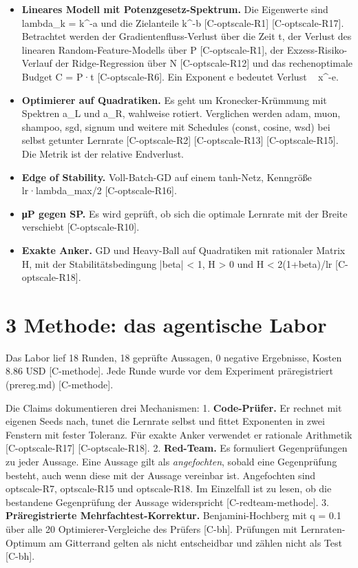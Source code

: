 \documentclass[10pt,twocolumn]{article}
\begin{document}
\begin{itemize}
\item \textbf{Lineares Modell mit Potenzgesetz-Spektrum.} Die Eigenwerte sind lambda_k = k^-a und die Zielanteile k^-b {\scriptsize[C-optscale-R1]} {\scriptsize[C-optscale-R17]}. Betrachtet werden der Gradientenfluss-Verlust über die Zeit t, der Verlust des linearen Random-Feature-Modells über P {\scriptsize[C-optscale-R1]}, der Exzess-Risiko-Verlauf der Ridge-Regression über N {\scriptsize[C-optscale-R12]} und das rechenoptimale Budget C = P·t {\scriptsize[C-optscale-R6]}. Ein Exponent e bedeutet Verlust ~ x^-e.
\item \textbf{Optimierer auf Quadratiken.} Es geht um Kronecker-Krümmung mit Spektren a_L und a_R, wahlweise rotiert. Verglichen werden adam, muon, shampoo, sgd, signum und weitere mit Schedules (const, cosine, wsd) bei selbst getunter Lernrate {\scriptsize[C-optscale-R2]} {\scriptsize[C-optscale-R13]} {\scriptsize[C-optscale-R15]}. Die Metrik ist der relative Endverlust.
\item \textbf{Edge of Stability.} Voll-Batch-GD auf einem tanh-Netz, Kenngröße lr·lambda_max/2 {\scriptsize[C-optscale-R16]}.
\item \textbf{μP gegen SP.} Es wird geprüft, ob sich die optimale Lernrate mit der Breite verschiebt {\scriptsize[C-optscale-R10]}.
\item \textbf{Exakte Anker.} GD und Heavy-Ball auf Quadratiken mit rationaler Matrix H, mit der Stabilitätsbedingung |beta| < 1, H > 0 und H < 2(1+beta)/lr {\scriptsize[C-optscale-R18]}.
\end{itemize}

\section{3 Methode: das agentische Labor}

Das Labor lief 18 Runden, 18 geprüfte Aussagen, 0 negative Ergebnisse, Kosten 8.86 USD {\scriptsize[C-methode]}. Jede Runde wurde vor dem Experiment präregistriert (prereg.md) {\scriptsize[C-methode]}.

Die Claims dokumentieren drei Mechanismen:
1. \textbf{Code-Prüfer.} Er rechnet mit eigenen Seeds nach, tunet die Lernrate selbst und fittet Exponenten in zwei Fenstern mit fester Toleranz. Für exakte Anker verwendet er rationale Arithmetik {\scriptsize[C-optscale-R17]} {\scriptsize[C-optscale-R18]}.
2. \textbf{Red-Team.} Es formuliert Gegenprüfungen zu jeder Aussage. Eine Aussage gilt als \emph{angefochten}, sobald eine Gegenprüfung besteht, auch wenn diese mit der Aussage vereinbar ist. Angefochten sind optscale-R7, optscale-R15 und optscale-R18. Im Einzelfall ist zu lesen, ob die bestandene Gegenprüfung der Aussage widerspricht {\scriptsize[C-redteam-methode]}.
3. \textbf{Präregistrierte Mehrfachtest-Korrektur.} Benjamini-Hochberg mit q = 0.1 über alle 20 Optimierer-Vergleiche des Prüfers {\scriptsize[C-bh]}. Prüfungen mit Lernraten-Optimum am Gitterrand gelten als nicht entscheidbar und zählen nicht als Test {\scriptsize[C-bh]}.
\end{document}
